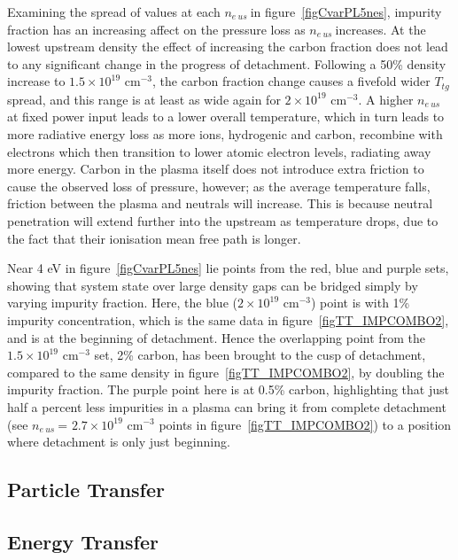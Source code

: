 \documentclass[11pt]{article}  %
\providecommand{\noNe}[1]{{${#1}\times 10^{19}$ cm$^{-3}$}} %
\providecommand{\neus}{$n_{e~us}~$} %
\providecommand{\Ttg}{$T_{tg}~$} %
\begin{document}
Examining the spread of values at each \neus in figure~\ref{figCvarPL5nes}, impurity fraction has an increasing affect on the pressure loss as \neus increases. At the lowest upstream density the effect of increasing the carbon fraction does not lead to any significant change in the progress of detachment. Following a 50\% density increase to \noNe{1.5}, the carbon fraction change causes a fivefold wider \Ttg spread, and this range is at least as wide again for \noNe{2}. A higher \neus at fixed power input leads to a lower overall temperature, which in turn leads to more radiative energy loss as more ions, hydrogenic and carbon, recombine with electrons which then transition to lower atomic electron levels, radiating away more energy. Carbon in the plasma itself does not introduce extra friction to cause the observed loss of pressure, however; as the average temperature falls, friction between the plasma and neutrals will increase. This is because neutral penetration will extend further into the upstream as temperature drops, due to the fact that their ionisation mean free path is longer.

Near 4 eV in figure~\ref{figCvarPL5nes} lie points from the red, blue and purple sets, showing that system state over large density gaps can be bridged simply by varying impurity fraction. Here, the blue (\noNe{2}) point is with 1\% impurity concentration, which is the same data in figure~\ref{figTT_IMPCOMBO2}, and is at the beginning of detachment. Hence the overlapping point from the \noNe{1.5} set, 2\% carbon, has been brought to the cusp of detachment, compared to the same density in figure~\ref{figTT_IMPCOMBO2}, by doubling the impurity fraction. The purple point here is at 0.5\% carbon, highlighting that just half a percent less impurities in a plasma can bring it from complete detachment (see \neus = \noNe{2.7} points in figure~\ref{figTT_IMPCOMBO2}) to a position where detachment is only just beginning.




\subsection{Particle Transfer}\label{ssecPtrans}


\subsection{Energy Transfer}\label{ssecEtrans}
\end{document}
